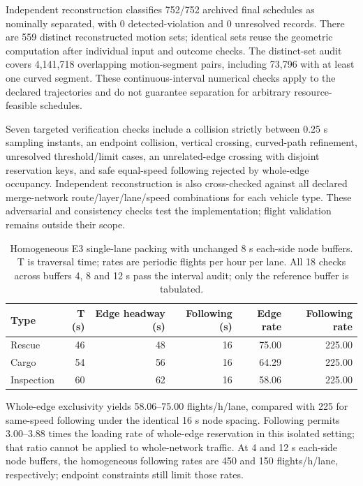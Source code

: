 Independent reconstruction classifies 752/752 archived final schedules as nominally separated, with 0 detected-violation and 0 unresolved records. There are 559 distinct reconstructed motion sets; identical sets reuse the geometric computation after individual input and outcome checks. The distinct-set audit covers 4,141,718 overlapping motion-segment pairs, including 73,796 with at least one curved segment. These continuous-interval numerical checks apply to the declared trajectories and do not guarantee separation for arbitrary resource-feasible schedules.

Seven targeted verification checks include a collision strictly between 0.25 s sampling instants, an endpoint collision, vertical crossing, curved-path refinement, unresolved threshold/limit cases, an unrelated-edge crossing with disjoint reservation keys, and safe equal-speed following rejected by whole-edge occupancy. Independent reconstruction is also cross-checked against all declared merge-network route/layer/lane/speed combinations for each vehicle type. These adversarial and consistency checks test the implementation; flight validation remains outside their scope.

\begin{table}[!htbp]
\centering\small
\caption{Homogeneous E3 single-lane packing with unchanged 8 s each-side node buffers. T is traversal time; rates are periodic flights per hour per lane. All 18 checks across buffers 4, 8 and 12 s pass the interval audit; only the reference buffer is tabulated.}\label{tab:isolated-capacity}
\begin{tabular}{lrrrrr}
\toprule
Type & T (s) & Edge headway (s) & Following (s) & Edge rate & Following rate\\
\midrule
Rescue & 46 & 48 & 16 & 75.00 & 225.00\\
Cargo & 54 & 56 & 16 & 64.29 & 225.00\\
Inspection & 60 & 62 & 16 & 58.06 & 225.00\\
\bottomrule
\end{tabular}
\end{table}

Whole-edge exclusivity yields 58.06--75.00 flights/h/lane, compared with 225 for same-speed following under the identical 16 s node spacing. Following permits 3.00--3.88 times the loading rate of whole-edge reservation in this isolated setting; that ratio cannot be applied to whole-network traffic. At 4 and 12 s each-side node buffers, the homogeneous following rates are 450 and 150 flights/h/lane, respectively; endpoint constraints still limit those rates.

